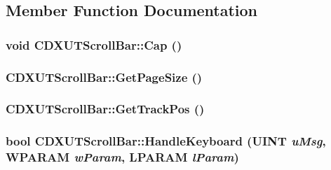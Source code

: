 \subsection{Member Function Documentation}
\hypertarget{class_c_d_x_u_t_scroll_bar_a2a680f2ce9c5fa971ccc9b618de9e8fa}{
\subsubsection[{Cap}]{\setlength{\rightskip}{0pt plus 5cm}void CDXUTScrollBar::Cap ()}}
\label{class_c_d_x_u_t_scroll_bar_a2a680f2ce9c5fa971ccc9b618de9e8fa}
\hypertarget{class_c_d_x_u_t_scroll_bar_aa345a24d104acd194af1c637bb386fc3}{
\subsubsection[{GetPageSize}]{ CDXUTScrollBar::GetPageSize ()}}
\label{class_c_d_x_u_t_scroll_bar_aa345a24d104acd194af1c637bb386fc3}
\hypertarget{class_c_d_x_u_t_scroll_bar_a96acaab90a5e33368ad8af53cb111e38}{
\subsubsection[{GetTrackPos}]{ CDXUTScrollBar::GetTrackPos ()}}
\label{class_c_d_x_u_t_scroll_bar_a96acaab90a5e33368ad8af53cb111e38}
\hypertarget{class_c_d_x_u_t_scroll_bar_a07c561820f6f3362f94a391c7ff58b04}{
\subsubsection[{HandleKeyboard}]{\setlength{\rightskip}{0pt plus 5cm}bool CDXUTScrollBar::HandleKeyboard (UINT {\em uMsg}, \/  WPARAM {\em wParam}, \/  LPARAM {\em lParam})}}
\label{class_c_d_x_u_t_scroll_bar_a07c561820f6f3362f94a391c7ff58b04}



